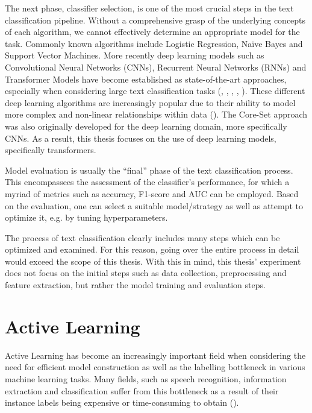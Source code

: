 \documentclass[english,bachelor,ul]{webisthesis} %
\begin{document}
The next phase, classifier selection, is one of the most crucial steps in the text classification pipeline. Without a comprehensive grasp of the underlying concepts of each algorithm, we cannot effectively determine an appropriate model for the task. Commonly known algorithms include Logistic Regression, Na\"ive Bayes and Support Vector Machines. More recently deep learning models such as Convolutional Neural Networks (CNNs), Recurrent Neural Networks (RNNs) and Transformer Models have become established as state-of-the-art approaches, especially when considering large text classification tasks (\cite{chen2015convolutional}, \cite{DBLP:conf/ijcai/LiuQH16}, \cite{DBLP:conf/aaai/LaiXLZ15}, \cite{DBLP:conf/naacl/DevlinCLT19}, \cite{DBLP:conf/cncl/SunQXH19}). These different deep learning algorithms are increasingly popular due to their ability to model more complex and non-linear relationships within data (\cite{DBLP:journals/nature/LeCunBH15}). The Core-Set approach was also originally developed for the deep learning domain, more specifically CNNs. As a result, this thesis focuses on the use of deep learning models, specifically transformers.

Model evaluation is usually the ``final'' phase of the text classification process. This encompassees the assessment of the classifier's performance, for which a myriad of metrics such as accuracy, F1-score and AUC can be employed. Based on the evaluation, one can select a suitable model/strategy as well as attempt to optimize it, e.g. by tuning hyperparameters.

The process of text classification clearly includes many steps which can be optimized and examined. For this reason, going over the entire process in detail would exceed the scope of this thesis. With this in mind, this thesis' experiment does not focus on the initial steps such as data collection, preprocessing and feature extraction, but rather the model training and evaluation steps.


\section{Active Learning}

Active Learning has become an increasingly important field when considering the need for efficient model construction as well as the labelling bottleneck in various machine learning tasks. Many fields, such as speech recognition, information extraction and classification suffer from this bottleneck as a result of their instance labels being expensive or time-consuming to obtain (\cite{settles.tr09}). 
\end{document}
